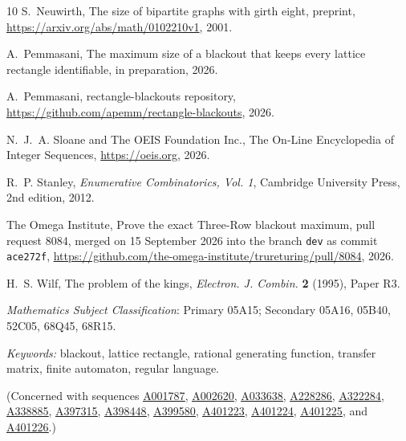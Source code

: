 \documentclass[12pt]{article}
\theoremstyle{plain}
\theoremstyle{definition}
\theoremstyle{remark}
\newcommand{\seqnum}[1]{\href{https://oeis.org/#1}{\rm \underline{#1}}}
\begin{document}
\begin{thebibliography}{10}
S.~Neuwirth, The size of bipartite graphs with girth eight, preprint,
  \url{https://arxiv.org/abs/math/0102210v1}, 2001.

A.~Pemmasani, The maximum size of a blackout that keeps every lattice rectangle
  identifiable, in preparation, 2026.

A.~Pemmasani, rectangle-blackouts repository,
  \url{https://github.com/apemm/rectangle-blackouts}, 2026.

N.~J.~A. Sloane and {The OEIS Foundation Inc.}, The {O}n-{L}ine {E}ncyclopedia
  of {I}nteger {S}equences, \url{https://oeis.org}, 2026.

R.~P. Stanley, {\em Enumerative Combinatorics, Vol. 1}, Cambridge University
  Press, 2nd edition, 2012.

{The Omega Institute}, Prove the exact {T}hree-{R}ow blackout maximum, pull
  request 8084, merged on 15 September 2026 into the branch \texttt{dev} as
  commit \texttt{ace272f},
  \url{https://github.com/the-omega-institute/trureturing/pull/8084}, 2026.

H.~S. Wilf, The problem of the kings, {\em Electron. J. Combin.} {\bf 2}
  (1995), Paper R3.

\end{thebibliography}

 {\it Mathematics Subject Classification}: Primary 05A15; Secondary
05A16, 05B40, 52C05, 68Q45, 68R15.

\noindent \emph{Keywords:} blackout, lattice rectangle, rational generating function,
transfer matrix, finite automaton, regular language.

\noindent (Concerned with sequences
\seqnum{A001787},
\seqnum{A002620},
\seqnum{A033638},
\seqnum{A228286},
\seqnum{A322284},
\seqnum{A338885},
\seqnum{A397315},
\seqnum{A398448},
\seqnum{A399580},
\seqnum{A401223},
\seqnum{A401224},
\seqnum{A401225}, and
\seqnum{A401226}.)
\end{document}
